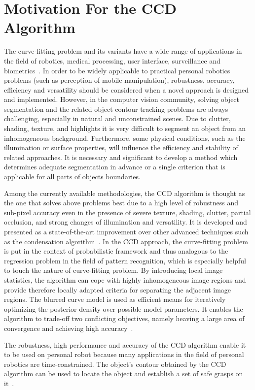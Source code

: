 \section{Motivation For the CCD Algorithm}
\label{sec:mccd}
The curve-fitting problem and its variants have a wide range of
applications in the field of robotics, medical processing, user
interface, surveillance and biometrics~\cite{hanek2004fitting}. In order to be
widely applicable to practical personal robotics problems (such as
perception of mobile manipulation), robustness,
accuracy, efficiency and versatility should be
considered when a novel approach is designed and implemented.
However, in the computer vision community, solving object segmentation and the
related object contour tracking problems are always challenging,
especially in natural and unconstrained scenes. Due to clutter,
shading, texture, and highlights it is very difficult to segment
an object from an inhomogeneous background. Furthermore, some physical
conditions, such as the illumination or surface properties, will
influence the efficiency and stability of related approaches. It is
necessary and significant to develop a method which determines adequate segmentation
in advance or a single criterion that is applicable for all parts of objects boundaries.

Among the currently available methodologies, the CCD algorithm is
thought as the one that solves above problems best due to a high level
of robustness and sub-pixel accuracy even in the presence of severe
texture, shading, clutter, partial occlusion, and strong changes of
illumination and versatility. It is developed and presented as a state-of-the-art
improvement over other advanced techniques such as the condensation
algorithm~\cite{isard1998icondensation}. In the CCD approach, the curve-fitting problem is
put in the context of probabilistic framework and thus analogous to
the regression problem in the field of pattern recognition, which is especially
helpful to touch the nature of curve-fitting problem. By introducing
local image statistics, the algorithm can cope with highly
inhomogeneous image regions and provide therefore locally adapted
criteria for separating the adjacent image regions. The blurred
curve model is used as efficient means for iteratively optimizing the
posterior density over possible model parameters. It enables the
algorithm to trade-off two conflicting objectives, namely heaving a
large area of convergence and achieving high
accuracy~\cite{hanek2004fitting}.

The robustness, high performance and accuracy of the CCD algorithm enable it 
to be used on personal robot  because many applications in the field
of personal robotics are time-constrained. The object's contour
obtained by the CCD algorithm can be used to locate the object and 
establish a set of safe grasps on it~\cite{hanek2000vision}.

